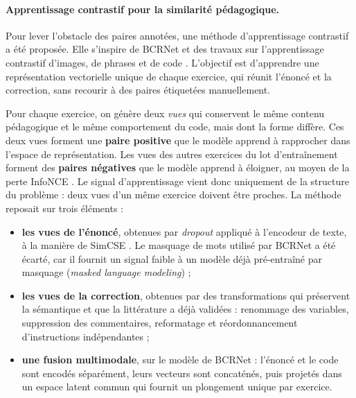 \documentclass[12pt,a4paper,oneside]{report}
\begin{document}
\paragraph{Apprentissage contrastif pour la similarité pédagogique.}

Pour lever l'obstacle des paires annotées, une méthode d'apprentissage
contrastif a été proposée. Elle s'inspire de BCRNet \cite{mu_2023} et des
travaux sur l'apprentissage contrastif d'images, de phrases et de code
\cite{chen_simclr_2020,gao_simcse_2021,jain_contracode_2021}. L'objectif est
d'apprendre une représentation vectorielle unique de chaque exercice, qui
réunit l'énoncé et la correction, sans recourir à des paires étiquetées
manuellement.

Pour chaque exercice, on génère deux \emph{vues} qui conservent le même
contenu pédagogique et le même comportement du code, mais dont la forme
diffère. Ces deux vues forment une \textbf{paire positive} que le modèle
apprend à rapprocher dans l'espace de représentation. Les vues des autres
exercices du lot d'entraînement forment des \textbf{paires négatives} que le
modèle apprend à éloigner, au moyen de la perte InfoNCE \cite{oord_infonce_2018}.
Le signal d'apprentissage vient donc uniquement de la structure du problème :
deux vues d'un même exercice doivent être proches. La méthode reposait sur
trois éléments :
\begin{itemize}
  \item \textbf{les vues de l'énoncé}, obtenues par \emph{dropout} appliqué à
        l'encodeur de texte, à la manière de SimCSE \cite{gao_simcse_2021}.
        Le masquage de mots utilisé par BCRNet a été écarté, car il fournit
        un signal faible à un modèle déjà pré-entraîné par masquage
        (\emph{masked language modeling}) ;
  \item \textbf{les vues de la correction}, obtenues par des transformations
        qui préservent la sémantique et que la littérature a déjà validées
        \cite{jain_contracode_2021,bui_corder_2021} : renommage des variables,
        suppression des commentaires, reformatage et réordonnancement
        d'instructions indépendantes ;
  \item \textbf{une fusion multimodale}, sur le modèle de BCRNet : l'énoncé
        et le code sont encodés séparément, leurs vecteurs sont concaténés,
        puis projetés dans un espace latent commun qui fournit un plongement
        unique par exercice.
\end{itemize}
\end{document}
